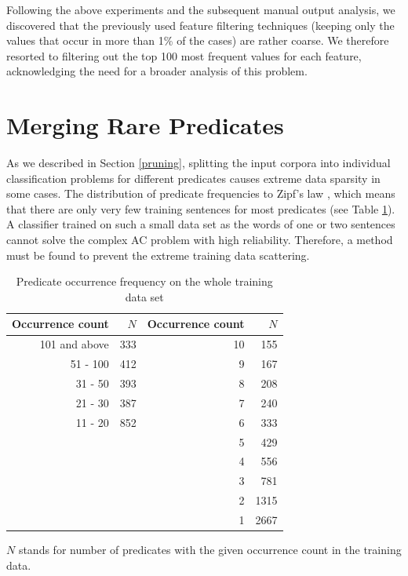 \documentclass[12pt,notitlepage]{report}
\begin{document}
Following the above experiments and the subsequent manual output analysis, we discovered that the previously used feature filtering techniques (keeping only the values that occur in more than 1\% of the cases) are rather coarse. We therefore resorted to filtering out the top 100 most frequent values for each feature, acknowledging the need for a broader analysis of this problem.

\section{Merging Rare Predicates}\label{ac-merge}

As we described in Section \ref{pruning}, splitting the input corpora into individual classification problems for different predicates causes extreme data sparsity in some cases. The distribution of predicate frequencies to Zipf's law \citep[p. 23ff.]{manning00}, which means that there are only very few training sentences for most predicates (see Table \ref{tab:pred-freq}). A classifier trained on such a small data set as the words of one or two sentences cannot solve the complex AC problem with high reliability. Therefore, a method must be found to prevent the extreme training data scattering.

\begin{table}[htb]\footnotesize
\caption{Predicate occurrence frequency on the whole training data set}\label{tab:pred-freq}
\begin{center}
\begin{tabular}{|r|r||r|r|}\hline
\bf Occurrence count & \bf $N$ & \bf Occurrence count & \bf $N$ \\\hline
101 and above & 333 & 10 & 155 \\\cline{1-2}
51 - 100 & 412 & 9 & 167 \\
31 - 50 & 393 & 8 & 208 \\\cline{1-2}
21 - 30 & 387 & 7 & 240 \\
11 - 20 & 852 & 6 & 333 \\\cline{1-2}
\multicolumn{2}{c|}{}& 5 & 429 \\
\multicolumn{2}{c|}{}& 4 & 556 \\
\multicolumn{2}{c|}{}& 3 & 781 \\
\multicolumn{2}{c|}{}& 2 & 1315 \\
\multicolumn{2}{c|}{}& 1 & 2667 \\\cline{3-4}
\end{tabular}
\end{center}
$N$ stands for number of predicates with the given occurrence count in the training data.
\end{table}
\end{document}
